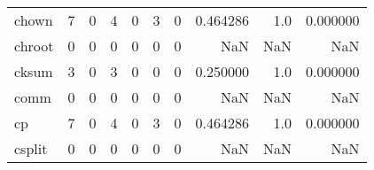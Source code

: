 \begin{tabular}{lrrrrrrrrr}
chown     &                                                  7 &                                                  0 &                                                  4 &                                                  0 &                                                  3 &                                                  0 &                                           0.464286 &                                    1.0 &                             0.000000 \\
chroot    &                                                  0 &                                                  0 &                                                  0 &                                                  0 &                                                  0 &                                                  0 &                                                NaN &                                    NaN &                                  NaN \\
cksum     &                                                  3 &                                                  0 &                                                  3 &                                                  0 &                                                  0 &                                                  0 &                                           0.250000 &                                    1.0 &                             0.000000 \\
comm      &                                                  0 &                                                  0 &                                                  0 &                                                  0 &                                                  0 &                                                  0 &                                                NaN &                                    NaN &                                  NaN \\
cp        &                                                  7 &                                                  0 &                                                  4 &                                                  0 &                                                  3 &                                                  0 &                                           0.464286 &                                    1.0 &                             0.000000 \\
csplit    &                                                  0 &                                                  0 &                                                  0 &                                                  0 &                                                  0 &                                                  0 &                                                NaN &                                    NaN &                                  NaN \\

\end{tabular}

